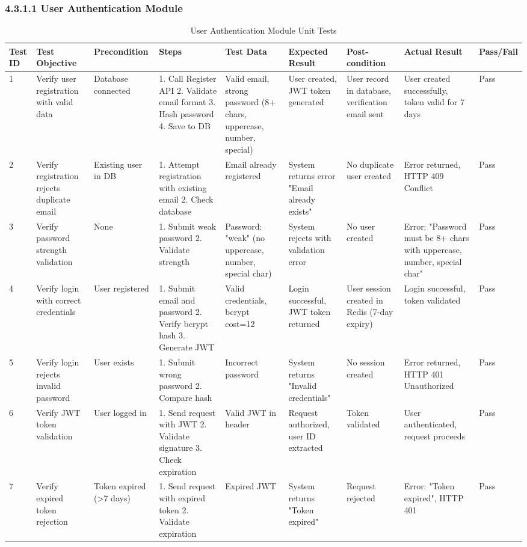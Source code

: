 \subsubsection{4.3.1.1 User Authentication Module}

\begin{table}[H]
\centering
\caption{User Authentication Module Unit Tests}
\tiny
\begin{tabular}{|p{0.4cm}|p{2cm}|p{1.2cm}|p{2cm}|p{2cm}|p{2cm}|p{1.5cm}|p{2cm}|p{0.7cm}|}
\hline
\textbf{Test ID} & \textbf{Test Objective} & \textbf{Precondition} & \textbf{Steps} & \textbf{Test Data} & \textbf{Expected Result} & \textbf{Post-condition} & \textbf{Actual Result} & \textbf{Pass/Fail} \\ \hline
1 & Verify user registration with valid data & Database connected & 1. Call Register API 2. Validate email format 3. Hash password 4. Save to DB & Valid email, strong password (8+ chars, uppercase, number, special) & User created, JWT token generated & User record in database, verification email sent & User created successfully, token valid for 7 days & Pass \\ \hline
2 & Verify registration rejects duplicate email & Existing user in DB & 1. Attempt registration with existing email 2. Check database & Email already registered & System returns error "Email already exists" & No duplicate user created & Error returned, HTTP 409 Conflict & Pass \\ \hline
3 & Verify password strength validation & None & 1. Submit weak password 2. Validate strength & Password: "weak" (no uppercase, number, special char) & System rejects with validation error & No user created & Error: "Password must be 8+ chars with uppercase, number, special char" & Pass \\ \hline
4 & Verify login with correct credentials & User registered & 1. Submit email and password 2. Verify bcrypt hash 3. Generate JWT & Valid credentials, bcrypt cost=12 & Login successful, JWT token returned & User session created in Redis (7-day expiry) & Login successful, token validated & Pass \\ \hline
5 & Verify login rejects invalid password & User exists & 1. Submit wrong password 2. Compare hash & Incorrect password & System returns "Invalid credentials" & No session created & Error returned, HTTP 401 Unauthorized & Pass \\ \hline
6 & Verify JWT token validation & User logged in & 1. Send request with JWT 2. Validate signature 3. Check expiration & Valid JWT in header & Request authorized, user ID extracted & Token validated & User authenticated, request proceeds & Pass \\ \hline
7 & Verify expired token rejection & Token expired (>7 days) & 1. Send request with expired token 2. Validate expiration & Expired JWT & System returns "Token expired" & Request rejected & Error: "Token expired", HTTP 401 & Pass \\ \hline
\end{tabular}
\label{tab:auth_tests}
\end{table}

